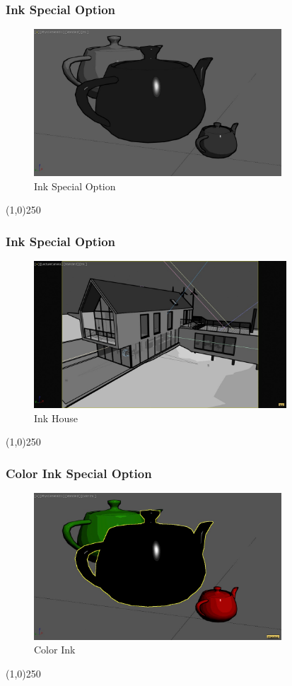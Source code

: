 \begin{frame}
\frametitle{Ink Special Option}
\begin{figure}
	\centering
	\includegraphics[height=5.5cm]{img/ViewportOptions/Ink.jpg}
	\caption{Ink Special Option}
	\label{fig:InkSpecialOption}
\end{figure}
\end{frame}
\begin{center}\line(1,0){250}\end{center}


\begin{frame}
\frametitle{Ink Special Option}
\begin{figure}
	\centering
	\includegraphics[height=5.5cm]{img/ViewportOptions/InkHouse.jpg}
	\caption{Ink House}
	\label{fig:InkHouse}
\end{figure}
\end{frame}
\begin{center}\line(1,0){250}\end{center}


\begin{frame}
\frametitle{Color Ink Special Option}
\begin{figure}
	\centering
	\includegraphics[height=5.5cm]{img/ViewportOptions/ColorInk.jpg}
	\caption{Color Ink}
	\label{fig:Ink}
\end{figure}
\end{frame}
\begin{center}\line(1,0){250}\end{center}


